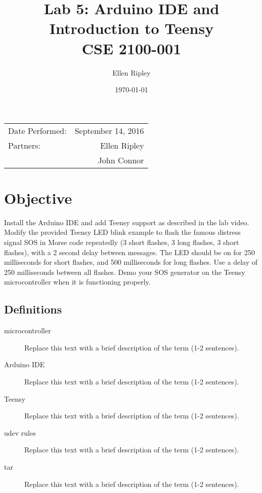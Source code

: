\documentclass{article}
\title{Lab 5: Arduino IDE and Introduction to Teensy \\ CSE 2100-001} %
\author{Ellen Ripley} %
\date{\today} %
\begin{document}
\maketitle %

\begin{center}
\begin{tabular}{l r}
Date Performed: & September 14, 2016 \\ %
Partners: & Ellen Ripley \\ %
& John Connor \\
\end{tabular}
\end{center}



\section{Objective}

Install the Arduino IDE and add Teensy support as described in the lab video. Modify the provided Teensy LED blink example to flash the famous distress signal SOS in Morse code repeatedly (3 short flashes, 3 long flashes, 3 short flashes), with a 2 second delay between messages. The LED should be on for 250 milliseconds for short flashes, and 500 milliseconds for long flashes. Use a delay of 250 milliseconds between all flashes. Demo your SOS generator on the Teensy microcontroller when it is functioning properly.

\subsection{Definitions}
\label{definitions}
\begin{description}
\item[microcontroller]
Replace this text with a brief description of the term (1-2 sentences).
\item[Arduino IDE]
Replace this text with a brief description of the term (1-2 sentences).
\item[Teensy]
Replace this text with a brief description of the term (1-2 sentences).
\item[udev rules]
Replace this text with a brief description of the term (1-2 sentences).
\item[tar]
Replace this text with a brief description of the term (1-2 sentences).
\end{description} 
 
\end{document}
